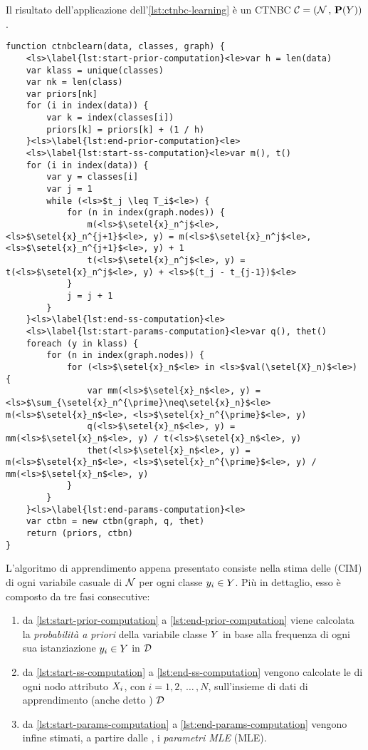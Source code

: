 Il risultato dell'applicazione dell'\autoref{lst:ctnbc-learning} è un \acl{CTNBC} $\mathcal{C}=(\mathcal{N}\,,\,\mathbf{P}(\mathnormal{Y}))$.
\vspace*{8pt}\begin{lstlisting}[language=pseudo,caption=Apprendimento di un classificatore \acs{CTNB}, label=lst:ctnbc-learning]
function ctnbclearn(data, classes, graph) {
    <ls>\label{lst:start-prior-computation}<le>var h = len(data)
    var klass = unique(classes)
    var nk = len(class)
    var priors[nk]
    for (i in index(data)) {
        var k = index(classes[i])
        priors[k] = priors[k] + (1 / h)
    }<ls>\label{lst:end-prior-computation}<le>
    <ls>\label{lst:start-ss-computation}<le>var m(), t()
    for (i in index(data)) {
        var y = classes[i]
        var j = 1
        while (<ls>$t_j \leq T_i$<le>) {
            for (n in index(graph.nodes)) {
                m(<ls>$\setel{x}_n^j$<le>, <ls>$\setel{x}_n^{j+1}$<le>, y) = m(<ls>$\setel{x}_n^j$<le>, <ls>$\setel{x}_n^{j+1}$<le>, y) + 1
                t(<ls>$\setel{x}_n^j$<le>, y) = t(<ls>$\setel{x}_n^j$<le>, y) + <ls>$(t_j - t_{j-1})$<le>
            }
            j = j + 1
        }
    }<ls>\label{lst:end-ss-computation}<le>
    <ls>\label{lst:start-params-computation}<le>var q(), thet()
    foreach (y in klass) {
        for (n in index(graph.nodes)) {
            for (<ls>$\setel{x}_n$<le> in <ls>$val(\setel{X}_n)$<le>) {
                var mm(<ls>$\setel{x}_n$<le>, y) = <ls>$\sum_{\setel{x}_n^{\prime}\neq\setel{x}_n}$<le> m(<ls>$\setel{x}_n$<le>, <ls>$\setel{x}_n^{\prime}$<le>, y)
                q(<ls>$\setel{x}_n$<le>, y) = mm(<ls>$\setel{x}_n$<le>, y) / t(<ls>$\setel{x}_n$<le>, y)
                thet(<ls>$\setel{x}_n$<le>, y) = m(<ls>$\setel{x}_n$<le>, <ls>$\setel{x}_n^{\prime}$<le>, y) / mm(<ls>$\setel{x}_n$<le>, y)
            }
        }
    }<ls>\label{lst:end-params-computation}<le>
    var ctbn = new ctbn(graph, q, thet)
    return (priors, ctbn)
}
\end{lstlisting}
L'algoritmo di apprendimento appena presentato consiste nella stima delle \cim{} (\acs{CIM}) di ogni variabile casuale di $\mathcal{N}$ per ogni classe $\mathnormal{y}_i \in \mathnormal{Y}$. Più in dettaglio, esso è composto da tre fasi consecutive:
\begin{enumerate}
    \item da \autoref{lst:start-prior-computation} a \autoref{lst:end-prior-computation} viene calcolata la \emph{probabilità a priori} della variabile classe $\mathnormal{Y}$ in base alla frequenza di ogni sua istanziazione $\mathnormal{y}_i \in\mathnormal{Y}$ in $\mathcal{D}$
    \item da \autoref{lst:start-ss-computation} a \autoref{lst:end-ss-computation} vengono calcolate le \stats{} di ogni nodo attributo $\mathnormal{X}_i$, con $i=1,2,\,\dotsc\,,N$, sull'insieme di dati di apprendimento (anche detto \emph{\keyword{\trs{}}}) $\mathcal{D}$
    \item da \autoref{lst:start-params-computation} a \autoref{lst:end-params-computation} vengono infine stimati, a partire dalle \stats{}, i \emph{parametri \acl{MLE}} (\acs{MLE}).
\end{enumerate}
